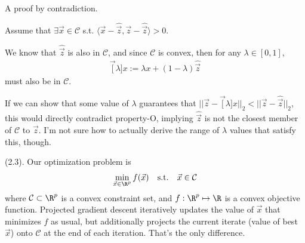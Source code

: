 \documentclass[11pt]{article}
\begin{document}
\begin{example}
	A proof by contradiction.
	\begin{compactenum}
		\item Assume that $\exists \vec x \in \mathcal C$ s.t. $ 	\langle \vec x - \hat{\vec z}, \vec z - \hat{\vec z} \rangle > 0$.
		
		\item We know that $\hat{\vec z}$ is also in $\mathcal C$, and since $\mathcal C$ is convex, then for any $\lambda \in [0, 1]$, 
		\begin{align}
		\vec[\lambda]{x} := \lambda x + (1 - \lambda) \hat{\vec z}
		\end{align}
		must also be in $\mathcal C$. 
		
		\item If we can show that some value of $\lambda$ guarantees that $||\vec z - \vec[\lambda]{x}||_2 < ||\vec z - \hat{\vec z}||_2$, this would directly contradict property-O, implying $\hat{\vec z}$ is not the closest member of $\mathcal C$ to $\vec z$. I'm not sure how to actually derive the range of $\lambda$ values that satisfy this, though. 
	\end{compactenum}  
\end{example}



\myspace
\p {} (2.3). Our optimization problem is
\begin{align}
\min_{\vec x \in \R^p} f(\vec x) \quad\text{s.t.}\quad \vec x \in \mathcal C
\end{align}
where $\mathcal C \subset \R^p$ is a convex constraint set, and $f: \R^p \mapsto \R$ is a convex objective function. Projected gradient descent iteratively updates the value of $\vec x$ that minimizes $f$ as usual, but additionally projects the current iterate (value of best $\vec x$) onto $\mathcal C$ at the end of each iteration. That's the only difference. 



\myspace
{}
\myspace
\end{document}
